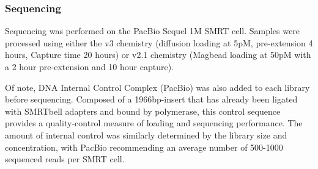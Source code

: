 \subsubsection{Sequencing} 
\label{section:ch2_sequencing}
Sequencing was performed on the PacBio Sequel 1M SMRT cell. Samples were processed using either the v3 chemistry (diffusion loading at 5pM, pre-extension 4 hours, Capture time 20 hours) or v2.1 chemistry (Magbead loading at 50pM with a 2 hour pre-extension and 10 hour capture).

Of note, DNA Internal Control Complex (PacBio) was also added to each library before sequencing. Composed of a 1966bp-insert that has already been ligated with SMRTbell adapters and bound by polymerase, this control sequence provides a quality-control measure of loading and sequencing performance. The amount of internal control was similarly determined by the library size and concentration, with PacBio recommending an average number of 500-1000 sequenced reads per SMRT cell.     

